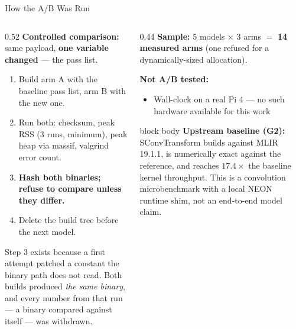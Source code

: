 \documentclass[10pt,aspectratio=169]{beamer}
\begin{document}
\begin{frame}{How the A/B Was Run}
\begin{columns}[T,totalwidth=0.99\textwidth]
\begin{column}{0.52\textwidth}
\textbf{Controlled comparison:} same payload, \textbf{one variable changed}
--- the pass list.

\vspace{0.2cm}
\begin{enumerate}
\small
\item Build arm A with the baseline pass list, arm B with the new one.
\item Run both: checksum, peak RSS (3 runs, minimum), peak heap via massif, valgrind error count.
\item \textcolor{edgered}{\textbf{Hash both binaries; refuse to compare unless they differ.}}
\item Delete the build tree before the next model.
\end{enumerate}

\vspace{0.2cm}
\small
Step 3 exists because a first attempt patched a constant the binary path does
not read. Both builds produced \emph{the same binary}, and every number from
that run --- a binary compared against itself --- was withdrawn.
\end{column}

\begin{column}{0.44\textwidth}
\textbf{Sample:} 5 models $\times$ 3 arms $=$ \textbf{14 measured arms}
(one refused for a dynamically-sized allocation).

\vspace{0.25cm}
\textbf{Not A/B tested:}
\begin{itemize}
\small
\item Wall-clock on a real Pi 4 --- no such hardware available for this work
\end{itemize}

\vspace{0.3cm}
\begin{beamercolorbox}[sep=0.4em,center,rounded=true,shadow=true]{block body}
\small
\textbf{Upstream baseline (G2):} SConvTransform builds against MLIR 19.1.1,
is numerically exact against the reference, and reaches \textbf{$17.4\times$}
the baseline kernel throughput. This is a convolution microbenchmark with a
local NEON runtime shim, not an end-to-end model claim.
\end{beamercolorbox}
\end{column}
\end{columns}
\end{frame}
\end{document}
